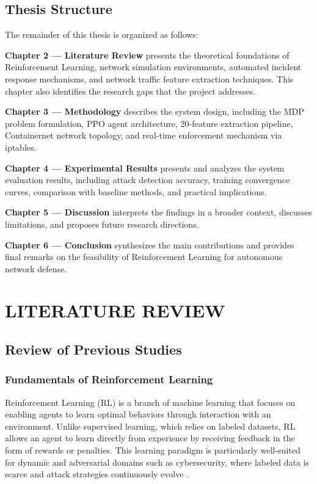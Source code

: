 \documentclass[12pt,a4paper]{report}
\begin{document}
\section{Thesis Structure}

The remainder of this thesis is organized as follows:

\textbf{Chapter 2 --- Literature Review} presents the theoretical foundations of Reinforcement Learning, network simulation environments, automated incident response mechanisms, and network traffic feature extraction techniques. This chapter also identifies the research gaps that the project addresses.

\textbf{Chapter 3 --- Methodology} describes the system design, including the MDP problem formulation, PPO agent architecture, 20-feature extraction pipeline, Containernet network topology, and real-time enforcement mechanism via iptables.

\textbf{Chapter 4 --- Experimental Results} presents and analyzes the system evaluation results, including attack detection accuracy, training convergence curves, comparison with baseline methods, and practical implications.

\textbf{Chapter 5 --- Discussion} interprets the findings in a broader context, discusses limitations, and proposes future research directions.

\textbf{Chapter 6 --- Conclusion} synthesizes the main contributions and provides final remarks on the feasibility of Reinforcement Learning for autonomous network defense.

\chapter{LITERATURE REVIEW}

\section{Review of Previous Studies}

\subsection{Fundamentals of Reinforcement Learning}

Reinforcement Learning (RL) is a branch of machine learning that focuses on enabling agents to learn optimal behaviors through interaction with an environment. Unlike supervised learning, which relies on labeled datasets, RL allows an agent to learn directly from experience by receiving feedback in the form of rewards or penalties. This learning paradigm is particularly well-suited for dynamic and adversarial domains such as cybersecurity, where labeled data is scarce and attack strategies continuously evolve \cite{suttonBarto2018}.
\end{document}
